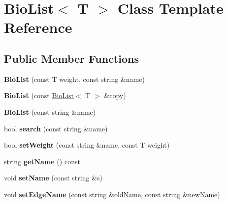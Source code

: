\hypertarget{class_bio_list}{}\section{Bio\+List$<$ T $>$ Class Template Reference}
\label{class_bio_list}
\subsection*{Public Member Functions}
\begin{DoxyCompactItemize}
\item 
\mbox{\label{class_bio_list_a99270bdf9463921b6435dcfb4e934f48}} 
{\bfseries Bio\+List} (const T weight, const string \&name)
\item 
\mbox{\label{class_bio_list_a29cc80d0382ce4ea7d78716e50367fb7}} 
{\bfseries Bio\+List} (const \hyperlink{class_bio_list}{Bio\+List}$<$ T $>$ \&copy)
\item 
\mbox{\label{class_bio_list_a02fab7396baad14645467bf22d5cc8b0}} 
{\bfseries Bio\+List} (const string \&name)
\item 
\mbox{\label{class_bio_list_a9de2c461d7d35a9b1b16bc22e36a4454}} 
bool {\bfseries search} (const string \&name)
\item 
\mbox{\label{class_bio_list_a4eee589ab99e7ece2d2a0aed97256170}} 
bool {\bfseries set\+Weight} (const string \&name, const T weight)
\item 
\mbox{\label{class_bio_list_aacb7962ae1ef89c2d0f94a98c6070882}} 
string {\bfseries get\+Name} () const
\item 
\mbox{\label{class_bio_list_a2598c5b263009fb1c5013b3e71a6db8a}} 
void {\bfseries set\+Name} (const string \&s)
\item 
\mbox{\label{class_bio_list_af96011889bf0085140db307b294132d3}} 
void {\bfseries set\+Edge\+Name} (const string \&old\+Name, const string \&new\+Name)
\item 
\mbox{\label{class_bio_list_ad62e949ed13930d687e2cb374643a3af}} 

\end{DoxyCompactItemize}
